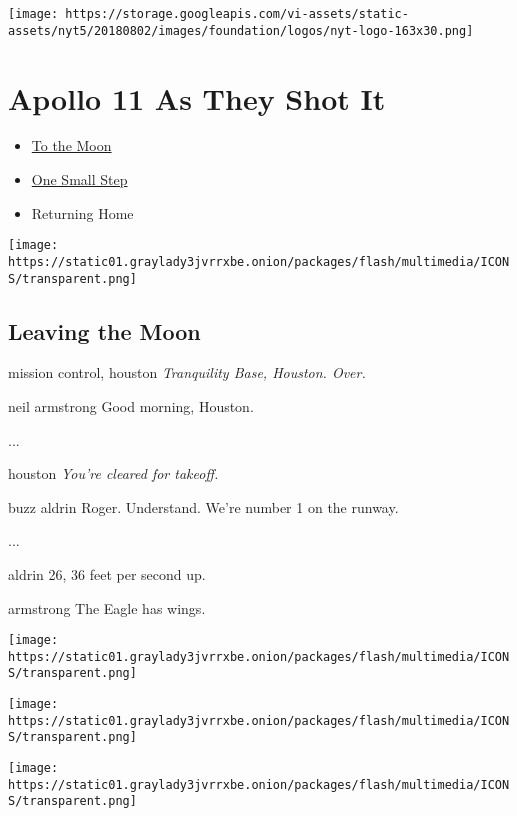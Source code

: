 \texttt{[image: https://storage.googleapis.com/vi-assets/static-assets/nyt5/20180802/images/foundation/logos/nyt-logo-163x30.png]}

\hypertarget{apollo-11-as-they-shot-it}{%
\section{\texorpdfstring{\textbf{Apollo 11} As They Shot
It}{Apollo 11 As They Shot It}}\label{apollo-11-as-they-shot-it}}

\begin{itemize}
\tightlist
\item
  \href{https://www.nytimes3xbfgragh.onion/interactive/2019/07/18/science/apollo-11-as-they-shot-it-ul.html}{To
  the Moon}
\item
  \href{https://www.nytimes3xbfgragh.onion/interactive/2019/07/18/science/apollo-11-moon-landing-photos-ul.html}{One
  Small Step}
\item
  Returning Home
\end{itemize}

\texttt{[image: https://static01.graylady3jvrrxbe.onion/packages/flash/multimedia/ICONS/transparent.png]}

\hypertarget{-leaving-the-moon-}{%
\subsection{ Leaving the Moon }\label{-leaving-the-moon-}}

mission control, houston \emph{Tranquility Base, Houston. Over.}

neil armstrong Good morning, Houston.

...

houston \emph{You're cleared for takeoff.}

buzz aldrin Roger. Understand. We're number 1 on the runway.

...

aldrin 26, 36 feet per second up.

armstrong The Eagle has wings.

\texttt{[image: https://static01.graylady3jvrrxbe.onion/packages/flash/multimedia/ICONS/transparent.png]}

\texttt{[image: https://static01.graylady3jvrrxbe.onion/packages/flash/multimedia/ICONS/transparent.png]}

\texttt{[image: https://static01.graylady3jvrrxbe.onion/packages/flash/multimedia/ICONS/transparent.png]}


